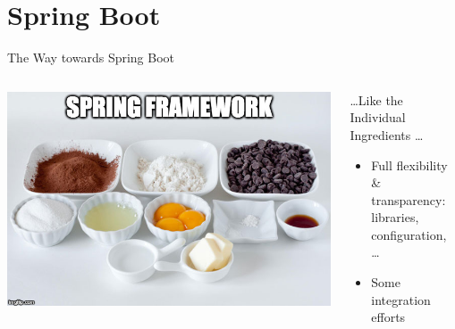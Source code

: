\part{Spring Boot}


\begin{frame}[t]{The Way towards Spring Boot}
\small
\begin{columns}[T] 
\begin{column}{.42\textwidth}
    \includegraphics[width=\textwidth]{../SpringBoot/images/spring-ingredients}
\end{column}
\begin{column}{.55\textwidth}
\ldots Like the Individual Ingredients \ldots
    \begin{itemize}
    \item Full flexibility \& transparency: \\libraries, configuration, \ldots
    \item Some integration efforts
    \end{itemize}
\end{column}
\end{columns}
\vfill
{}
\end{frame}
